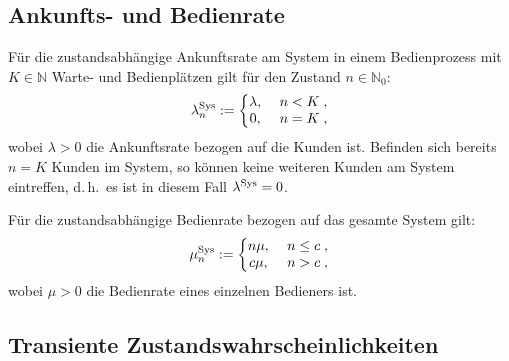 \documentclass[a4paper,11pt,oneside]{article}
\theoremstyle{definition}
\begin{document}
\subsection{Ankunfts- und Bedienrate}

Für die zustandsabhängige Ankunftsrate am System in einem Bedienprozess mit $K\in\mathbb{N}$ Warte- und Bedienplätzen gilt für den Zustand $n\in\mathbb{N}_0$:
\begin{equation}\label{GleichungMarkovAnkunftsrate}
\lambda_n^{\rm Sys}:=\left\{\begin{matrix}
\lambda,&~n<K\;,\\
0,&~n=K\;,
\end{matrix}\right.
\end{equation}
wobei $\lambda>0$ die Ankunftsrate bezogen auf die Kunden ist. Befinden sich bereits $n=K$ Kunden im System, so können keine weiteren Kunden am System eintreffen, d.\,h.\ es ist in diesem Fall $\lambda^{\rm Sys}=0$.

Für die zustandsabhängige Bedienrate bezogen auf das gesamte System gilt:
\begin{equation}\label{GleichungMarkovBedienrate}
\mu_n^{\rm Sys}:=\left\{\begin{matrix}
n\mu,&~n\le c\;,\\
c\mu,&~n>c\;,
\end{matrix}\right.
\end{equation}
wobei $\mu>0$ die Bedienrate eines einzelnen Bedieners ist.

\subsection{Transiente Zustandswahrscheinlichkeiten}
\end{document}
